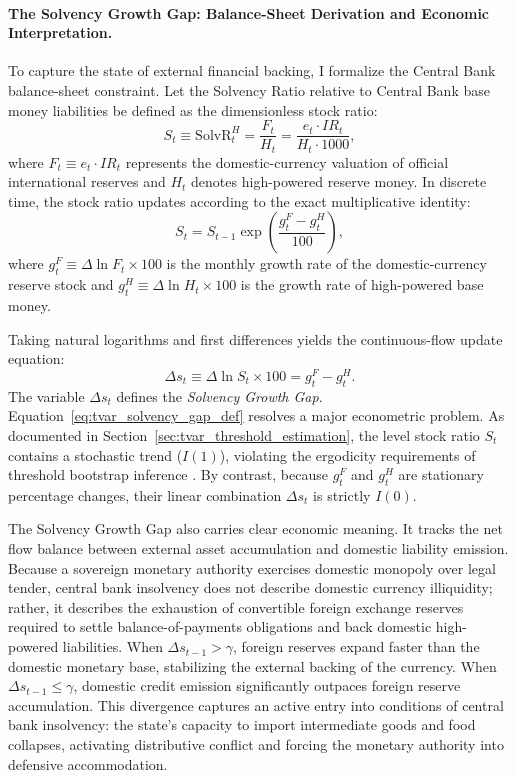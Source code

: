 \paragraph{The Solvency Growth Gap: Balance-Sheet Derivation and Economic Interpretation.}
To capture the state of external financial backing, I formalize the Central Bank balance-sheet constraint. Let the Solvency Ratio relative to Central Bank base money liabilities be defined as the dimensionless stock ratio:
\begin{equation}
    S_t \equiv \text{SolvR}^H_t = \frac{F_t}{H_t} = \frac{e_t \cdot IR_t}{H_t \cdot 1000},
    \label{eq:tvar_solv_stock_def}
\end{equation}
where $F_t \equiv e_t \cdot IR_t$ represents the domestic-currency valuation of official international reserves and $H_t$ denotes high-powered reserve money. In discrete time, the stock ratio updates according to the exact multiplicative identity:
\begin{equation}
    S_t = S_{t-1} \exp\left( \frac{g^F_t - g^H_t}{100} \right),
    \label{eq:tvar_stock_flow_update}
\end{equation}
where $g^F_t \equiv \Delta \ln F_t \times 100$ is the monthly growth rate of the domestic-currency reserve stock and $g^H_t \equiv \Delta \ln H_t \times 100$ is the growth rate of high-powered base money. 

Taking natural logarithms and first differences yields the continuous-flow update equation:
\begin{equation}
    \Delta s_t \equiv \Delta \ln S_t \times 100 = g^F_t - g^H_t.
    \label{eq:tvar_solvency_gap_def}
\end{equation}
The variable $\Delta s_t$ defines the \emph{Solvency Growth Gap}. Equation~\eqref{eq:tvar_solvency_gap_def} resolves a major econometric problem. As documented in Section~\ref{sec:tvar_threshold_estimation}, the level stock ratio $S_t$ contains a stochastic trend ($I(1)$), violating the ergodicity requirements of threshold bootstrap inference \citep{Hansen1997,Hansen2000}. By contrast, because $g^F_t$ and $g^H_t$ are stationary percentage changes, their linear combination $\Delta s_t$ is strictly $I(0)$. 

The Solvency Growth Gap also carries clear economic meaning. It tracks the net flow balance between external asset accumulation and domestic liability emission. Because a sovereign monetary authority exercises domestic monopoly over legal tender, central bank insolvency does not describe domestic currency illiquidity; rather, it describes the exhaustion of convertible foreign exchange reserves required to settle balance-of-payments obligations and back domestic high-powered liabilities. When $\Delta s_{t-1} > \gamma$, foreign reserves expand faster than the domestic monetary base, stabilizing the external backing of the currency. When $\Delta s_{t-1} \le \gamma$, domestic credit emission significantly outpaces foreign reserve accumulation. This divergence captures an active entry into conditions of central bank insolvency: the state's capacity to import intermediate goods and food collapses, activating distributive conflict and forcing the monetary authority into defensive accommodation.

